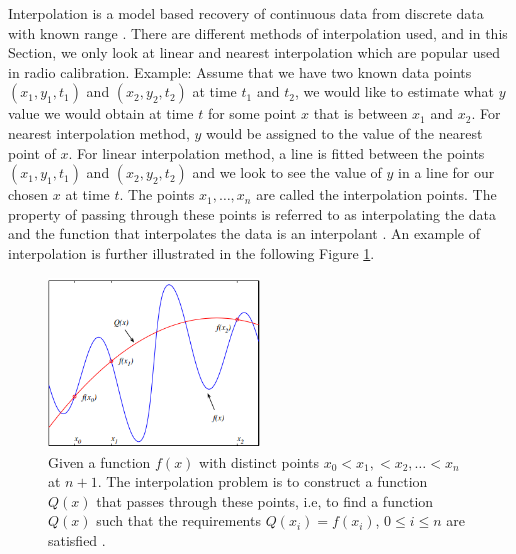 Interpolation is a model based recovery of continuous data from discrete data with known range \citep{thevenaz2000image}. There are different methods of interpolation used, and in this Section, we only look at linear and nearest interpolation which are popular used in radio calibration. Example: Assume that we have two known data points $(x_1,y_1,t_1)$ and  $(x_2,y_2,t_2)$ at time $t_1$ and $t_2$, we would like to estimate what $y$ value we would obtain at time $t$ for some point $x$ that is between $x_1$ and $x_2$. For nearest interpolation method, $y$ would be assigned to the value of the nearest point of $x$. For linear interpolation method, a line is fitted between the points $(x_1,y_1,t_1)$ and $(x_2,y_2,t_2)$  and we look to see the value of $y$ in a line for our chosen $x$ at time $t$. The points $x_1,\dots, x_n$ are called the interpolation points. The property of passing
through these points is referred to as interpolating the data and the function that interpolates the data is an interpolant \citep{levy2010introduction}. An example of interpolation is further illustrated in the following Figure \ref{int}. 

  \begin{figure}[H]
  \centering
    \includegraphics[width=0.5\textwidth]{images/Int.png}
    \caption{Given a function $f(x)$ with distinct points $x_0<x_1,<x_2,\dots <x_n$ at $n+1$. The interpolation problem is to construct a function $Q(x)$ that passes through these points, i.e, to find a function $Q(x)$ such that the requirements $Q(x_i)=f(x_i)$, $0\leq i\leq n$ are satisfied \citep{levy2010introduction}.}
  \label{int}
\end{figure}

